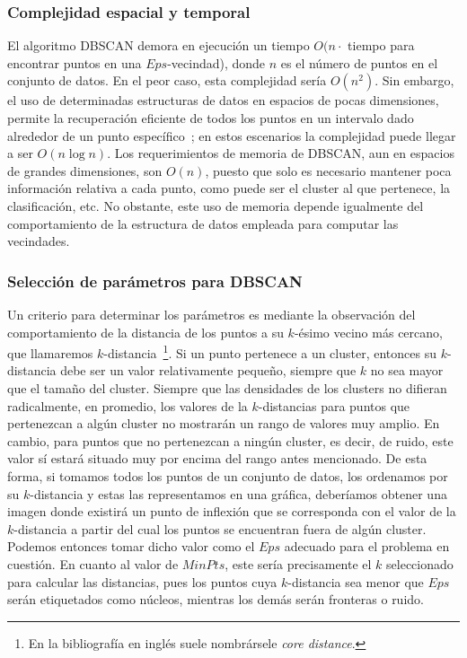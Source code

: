 \subsubsection{Complejidad espacial y temporal}

El algoritmo DBSCAN demora en ejecución un tiempo $O(n \cdot$ tiempo para encontrar puntos en una $Eps$-vecindad), donde $n$ es el número de puntos en el conjunto de datos.
En el peor caso, esta complejidad sería $O(n^2)$.
Sin embargo, el uso de determinadas estructuras de datos en espacios de pocas dimensiones, permite la recuperación eficiente de todos los puntos en un intervalo dado alrededor de un punto específico~\cite{Tan05};
en estos escenarios la complejidad puede llegar a ser $O(n\log n)$.
Los requerimientos de memoria de DBSCAN, aun en espacios de grandes dimensiones, son $O(n)$, puesto que solo es necesario mantener poca información relativa a cada punto, como puede ser el cluster al que pertenece, la clasificación, etc.
No obstante, este uso de memoria depende igualmente del comportamiento de la estructura de datos empleada para computar las vecindades.

\subsubsection{Selección de parámetros para DBSCAN}\label{subsubsec:paramsDBSCAN}

Un criterio para determinar los parámetros es mediante la observación del comportamiento de la distancia de los puntos a su $k$-ésimo vecino más cercano, que llamaremos $k$-distancia~\footnote{En la bibliografía en inglés suele nombrársele \textit{core distance}.}.
Si un punto pertenece a un cluster, entonces su $k$-distancia debe ser un valor relativamente pequeño, siempre que $k$ no sea mayor que el tamaño del cluster.
Siempre que las densidades de los clusters no difieran radicalmente, en promedio, los valores de la $k$-distancias para puntos que pertenezcan a algún cluster no mostrarán un rango de valores muy amplio.
En cambio, para puntos que no pertenezcan a ningún cluster, es decir, de ruido, este valor sí estará situado muy por encima del rango antes mencionado.
De esta forma, si tomamos todos los puntos de un conjunto de datos, los ordenamos por su $k$-distancia y estas las representamos en una gráfica, deberíamos obtener una imagen donde existirá un punto de inflexión que se corresponda con el valor de la $k$-distancia a partir del cual los puntos se encuentran fuera de algún cluster.
Podemos entonces tomar dicho valor como el $Eps$ adecuado para el problema en cuestión.
En cuanto al valor de $MinPts$, este sería precisamente el $k$ seleccionado para calcular las distancias, pues los puntos cuya $k$-distancia sea menor que $Eps$ serán etiquetados como núcleos, mientras los demás serán fronteras o ruido.

